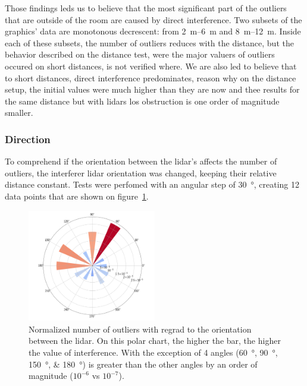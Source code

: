 Those findings leds us to believe that the most significant part of the outliers that are outside of the room are caused by direct interference. Two subsets of the graphics' data are monotonous decrescent: from \SIrange{2}{6}{\meter} and \SIrange{8}{12}{\meter}. Inside each of these subsets, the number of outliers reduces with the distance, but the behavior described on the distance test, were the major valuers of outliers occured on short distances, is not verified where. We are also led to believe that to short distances, direct interference predominates, reason why on the distance setup, the initial values were much higher than they are now and thee results for the same distance but with \acp{lidar} \ac{los} obstruction is one order of magnitude smaller.

\subsubsection{Direction}
To comprehend if the orientation between the \ac{lidar}'s affects the number of outliers, the interferer \ac{lidar} orientation was changed, keeping their relative distance constant. Tests were perfomed with an angular step of \SI{30}{\degree}, creating 12 data points that are shown on figure~\ref{fig:box-filter-outliers-direction}.

\begin{figure}[!ht]
	\centering
	\includegraphics[width=0.5\textwidth]{img/lidar-interference/box-filtering/interference-box-filter-outliers-direction.png}
	\caption{Normalized number of outliers with regrad to the orientation between the \ac{lidar}. On this polar chart, the higher the bar, the higher the value of interference. With the exception of 4 angles (\SIlist[list-final-separator = {, }]{60; 90; 150; 180}{\degree}) is greater than the other angles by an order of magnitude ($10^{-6}$ vs $10^{-7}$).}
	\label{fig:box-filter-outliers-direction}
\end{figure}

